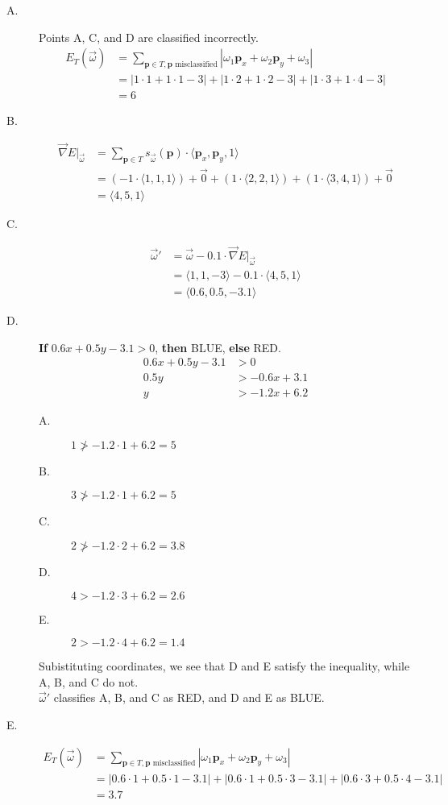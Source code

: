 \documentclass{article}
\begin{document}
\begin{description}
	\item [A.] Points A, C, and D are classified incorrectly.
	\begin{align*}
		E_T(\vec{\omega})&=\sum_{\textbf{p}\in T,\textbf{p}\text{ misclassified}}|\omega_1\textbf{p}_x+\omega_2\textbf{p}_y+\omega_3|\\
		&=|1\cdot 1+1\cdot 1-3|+|1\cdot 2+1\cdot 2-3|+|1\cdot 3+1\cdot 4-3|\\
		&=6
	\end{align*}
	\item [B.]
	\begin{align*}
		\vec{\nabla}E|_{\vec{\omega}}&=\sum_{\textbf{p}\in T}s_{\vec{\omega}}(\textbf{p})\cdot\langle\textbf{p}_x,\textbf{p}_y,1\rangle\\
		&=(-1\cdot\langle 1,1,1\rangle)+\vec{0}+(1\cdot\langle 2,2,1\rangle)+(1\cdot\langle 3,4,1\rangle)+\vec{0}\\
		&=\langle 4,5,1\rangle
	\end{align*}
	\item [C.]
	\begin{align*}
		\vec{\omega}'&=\vec{\omega}-0.1\cdot\vec{\nabla}E|_{\vec{\omega}}\\
		&=\langle 1,1,-3\rangle - 0.1\cdot\langle 4,5,1\rangle\\
		&=\langle 0.6,0.5,-3.1\rangle
	\end{align*}
	\item [D.] \textbf{If} $0.6x+0.5y-3.1>0$, \textbf{then} BLUE, \textbf{else} RED.
	\begin{align*}
		0.6x+0.5y-3.1&>0\\
		0.5y&>-0.6x+3.1\\
		y&>-1.2x+6.2
	\end{align*}
	\begin{description}
		\item [A.] $1\ngtr-1.2\cdot 1+6.2=5$
		\item [B.] $3\ngtr-1.2\cdot 1+6.2=5$
		\item [C.] $2\ngtr-1.2\cdot 2+6.2=3.8$
		\item [D.] $4>-1.2\cdot 3+6.2=2.6$
		\item [E.] $2>-1.2\cdot 4+6.2=1.4$
	\end{description}
	Subistituting coordinates, we see that D and E satisfy the inequality, while A, B, and C do not.\\
	$\vec{\omega}'$ classifies A, B, and C as RED, and D and E as BLUE.
	\item [E.]
	\begin{align*}
		E_T(\vec{\omega})&=\sum_{\textbf{p}\in T,\textbf{p}\text{ misclassified}}|\omega_1\textbf{p}_x+\omega_2\textbf{p}_y+\omega_3|\\
		&=|0.6\cdot 1+0.5\cdot 1-3.1|+|0.6\cdot 1+0.5\cdot 3-3.1|+|0.6\cdot 3+0.5\cdot 4-3.1|\\
		&=3.7
	\end{align*}
\end{description}
\end{document}
